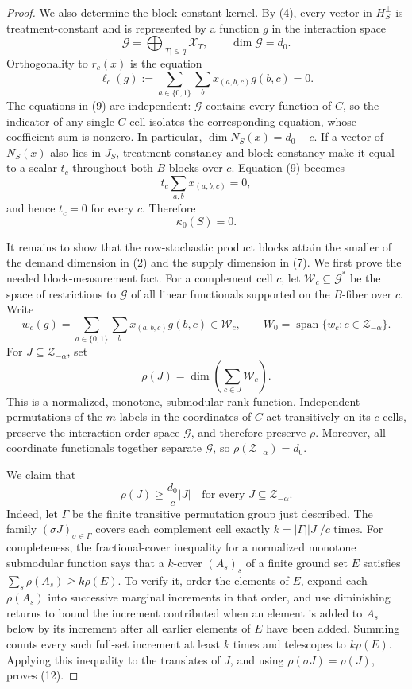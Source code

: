 \documentclass{article}
\begin{document}
\begin{proof}
We also determine the block-constant kernel.  By (4), every vector in
\(H_S^\perp\) is treatment-constant and is represented by a function
\(g\) in the interaction space
\[
\mathscr G=\bigoplus_{\lvert T\rvert\le q}\mathscr X_T,
\qquad \dim\mathscr G=d_0.
\tag{8}
\]
Orthogonality to \(r_c(x)\) is the equation
\[
\ell_c(g):=\sum_{a\in\{0,1\}}\sum_b x_{(a,b,c)}g(b,c)=0.
\tag{9}
\]
The equations in (9) are independent: \(\mathscr G\) contains every function
of \(C\), so the indicator of any single \(C\)-cell isolates the corresponding
equation, whose coefficient sum is nonzero.  In particular,
\(\dim N_S(x)=d_0-c\).  If a vector of \(N_S(x)\) also lies in \(J_S\), treatment
constancy and block constancy make it equal to a scalar \(t_c\) throughout both
\(B\)-blocks over \(c\).  Equation (9) becomes
\[
t_c\sum_{a,b}x_{(a,b,c)}=0,
\]
and hence \(t_c=0\) for every \(c\).  Therefore
\[
\kappa_0(S)=0.
\tag{10}
\]

It remains to show that the row-stochastic product blocks attain the smaller of
the demand dimension in (2) and the supply dimension in (7).  We first prove the
needed block-measurement fact.  For a complement cell \(c\), let
\(\mathscr W_c\subseteq\mathscr G^*\) be the space of restrictions to
\(\mathscr G\) of all linear functionals supported on the \(B\)-fiber over
\(c\).  Write
\[
w_c(g)=\sum_{a\in\{0,1\}}\sum_b x_{(a,b,c)}g(b,c)\in\mathscr W_c,
\qquad W_0=\operatorname{span}\{w_c:c\in\mathcal Z_{-\alpha}\}.
\]
For \(J\subseteq\mathcal Z_{-\alpha}\), set
\[
\rho(J)=\dim\left(\sum_{c\in J}\mathscr W_c\right).
\tag{11}
\]
This is a normalized, monotone, submodular rank function.  Independent
permutations of the \(m\) labels in the coordinates of \(C\) act transitively
on its \(c\) cells, preserve the interaction-order space \(\mathscr G\), and
therefore preserve \(\rho\).  Moreover, all coordinate functionals together
separate \(\mathscr G\), so \(\rho(\mathcal Z_{-\alpha})=d_0\).

We claim that
\[
\rho(J)\ge \frac{d_0}{c}\lvert J\rvert
\quad\text{for every }J\subseteq\mathcal Z_{-\alpha}.
\tag{12}
\]
Indeed, let \(\Gamma\) be the finite transitive permutation group just
described.  The family \((\sigma J)_{\sigma\in\Gamma}\) covers each complement
cell exactly
\(k=\lvert\Gamma\rvert\lvert J\rvert/c\) times.  For completeness, the
fractional-cover inequality for a normalized monotone submodular function says
that a \(k\)-cover \((A_s)_s\) of a finite ground set \(E\) satisfies
\(\sum_s\rho(A_s)\ge k\rho(E)\).  To verify it, order the elements of \(E\),
expand each \(\rho(A_s)\) into successive marginal increments in that order,
and use diminishing returns to bound the increment contributed when an element
is added to \(A_s\) below by its increment after all earlier elements of \(E\)
have been added.  Summing counts every such full-set increment at least \(k\)
times and telescopes to \(k\rho(E)\).  Applying this inequality to the translates
of \(J\), and using \(\rho(\sigma J)=\rho(J)\), proves (12).


\end{proof}
\end{document}
